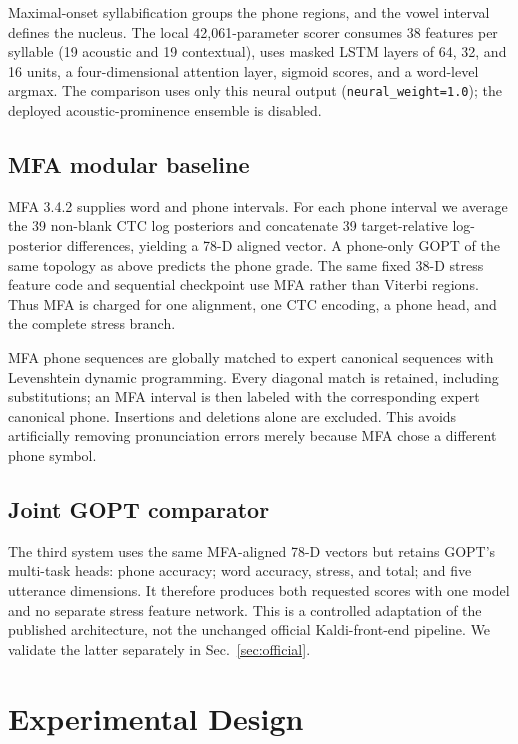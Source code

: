 \documentclass[10pt,conference]{IEEEtran}
\begin{document}
Maximal-onset syllabification groups the phone regions, and the vowel interval
defines the nucleus. The local 42,061-parameter scorer consumes 38 features per
syllable (19 acoustic and 19 contextual), uses masked LSTM layers of 64, 32,
and 16 units, a four-dimensional attention layer, sigmoid scores, and a
word-level argmax. The comparison uses only this neural output
(\texttt{neural\_weight=1.0}); the deployed acoustic-prominence ensemble is
disabled.

\subsection{MFA modular baseline}

MFA 3.4.2 supplies word and phone intervals. For each phone interval we
average the 39 non-blank CTC log posteriors and concatenate 39 target-relative
log-posterior differences, yielding a 78-D aligned vector. A phone-only GOPT of
the same topology as above predicts the phone grade. The same fixed 38-D
stress feature code and sequential checkpoint use MFA rather than Viterbi
regions. Thus MFA is charged for one alignment, one CTC encoding, a phone head,
and the complete stress branch.

MFA phone sequences are globally matched to expert canonical sequences with
Levenshtein dynamic programming. Every diagonal match is retained, including
substitutions; an MFA interval is then labeled with the corresponding expert
canonical phone. Insertions and deletions alone are excluded. This avoids
artificially removing pronunciation errors merely because MFA chose a
different phone symbol.

\subsection{Joint GOPT comparator}

The third system uses the same MFA-aligned 78-D vectors but retains GOPT's
multi-task heads: phone accuracy; word accuracy, stress, and total; and five
utterance dimensions. It therefore produces both requested scores with one
model and no separate stress feature network. This is a controlled adaptation
of the published architecture, not the unchanged official Kaldi-front-end
pipeline. We validate the latter separately in Sec.~\ref{sec:official}.

\section{Experimental Design}
\end{document}
